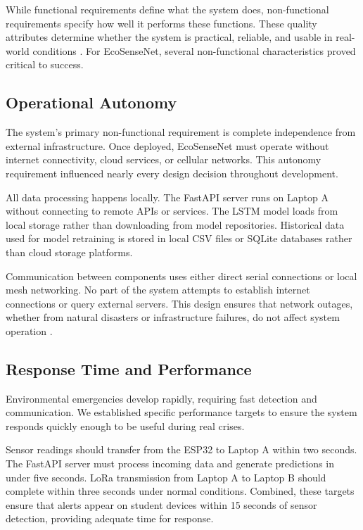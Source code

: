 While functional requirements define what the system does, non-functional requirements specify how well it performs these functions. These quality attributes determine whether the system is practical, reliable, and usable in real-world conditions \cite{chung2012non}. For EcoSenseNet, several non-functional characteristics proved critical to success.

\subsection{Operational Autonomy}

The system's primary non-functional requirement is complete independence from external infrastructure. Once deployed, EcoSenseNet must operate without internet connectivity, cloud services, or cellular networks. This autonomy requirement influenced nearly every design decision throughout development.

All data processing happens locally. The FastAPI server runs on Laptop A without connecting to remote APIs or services. The LSTM model loads from local storage rather than downloading from model repositories. Historical data used for model retraining is stored in local CSV files or SQLite databases rather than cloud storage platforms.

Communication between components uses either direct serial connections or local mesh networking. No part of the system attempts to establish internet connections or query external servers. This design ensures that network outages, whether from natural disasters or infrastructure failures, do not affect system operation \cite{qadir2016supporting}.

\subsection{Response Time and Performance}

Environmental emergencies develop rapidly, requiring fast detection and communication. We established specific performance targets to ensure the system responds quickly enough to be useful during real crises.

Sensor readings should transfer from the ESP32 to Laptop A within two seconds. The FastAPI server must process incoming data and generate predictions in under five seconds. LoRa transmission from Laptop A to Laptop B should complete within three seconds under normal conditions. Combined, these targets ensure that alerts appear on student devices within 15 seconds of sensor detection, providing adequate time for response.

